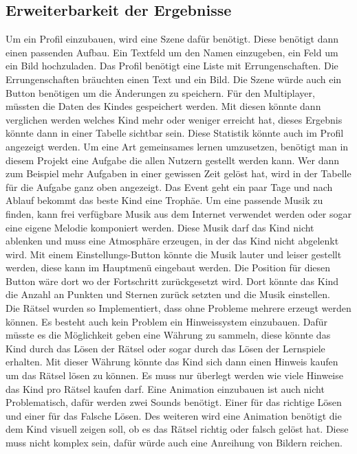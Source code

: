 \subsection{Erweiterbarkeit der Ergebnisse}
\label{sub:erweiterbarkeit}

Um ein Profil einzubauen, wird eine Szene dafür benötigt. Diese benötigt dann einen passenden Aufbau. Ein Textfeld um den Namen einzugeben, ein Feld um ein Bild hochzuladen. Das Profil benötigt eine Liste mit Errungenschaften. Die Errungenschaften bräuchten einen Text und ein Bild. Die Szene würde auch ein Button benötigen um die Änderungen zu speichern. Für den Multiplayer, müssten die Daten des Kindes gespeichert werden. Mit diesen könnte dann verglichen werden welches Kind mehr oder weniger erreicht hat, dieses Ergebnis könnte dann in einer Tabelle sichtbar sein. Diese Statistik könnte auch im Profil angezeigt werden. Um eine Art gemeinsames lernen umzusetzen, benötigt man in diesem Projekt eine Aufgabe die allen Nutzern gestellt werden kann. Wer dann zum Beispiel mehr Aufgaben in einer gewissen Zeit gelöst hat, wird in der Tabelle für die Aufgabe ganz oben angezeigt. Das Event geht ein paar Tage und nach Ablauf bekommt das beste Kind eine Trophäe. Um eine passende Musik zu finden, kann frei verfügbare Musik aus dem Internet verwendet werden oder sogar eine eigene Melodie komponiert werden. Diese Musik darf das Kind nicht ablenken und muss eine Atmosphäre erzeugen, in der das Kind nicht abgelenkt wird. Mit einem Einstellungs-Button könnte die Musik lauter und leiser gestellt werden, diese kann im Hauptmenü eingebaut werden. Die Position für diesen Button wäre dort wo der Fortschritt zurückgesetzt wird. Dort könnte das Kind die Anzahl an Punkten und Sternen zurück setzten und die Musik einstellen.\\
Die Rätsel wurden so Implementiert, dass ohne Probleme mehrere erzeugt werden können. Es besteht auch kein Problem ein Hinweissystem einzubauen. Dafür müsste es die Möglichkeit geben eine Währung zu sammeln, diese könnte das Kind durch das Lösen der Rätsel oder sogar durch das Lösen der Lernspiele erhalten. Mit dieser Währung könnte das Kind sich dann einen Hinweis kaufen um das Rätsel lösen zu können. Es muss nur überlegt werden wie viele Hinweise das Kind pro Rätsel kaufen darf. Eine Animation einzubauen ist auch nicht Problematisch, dafür werden zwei Sounds benötigt. Einer für das richtige Lösen und einer für das Falsche Lösen. Des weiteren wird eine Animation benötigt die dem Kind visuell zeigen soll, ob es das Rätsel richtig oder falsch gelöst hat. Diese muss nicht komplex sein, dafür würde auch eine Anreihung von Bildern reichen. \\
